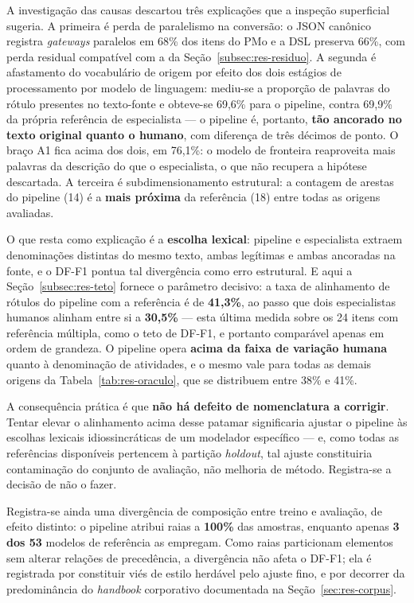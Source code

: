 A investigação das causas descartou três explicações que a inspeção superficial sugeria. A primeira é perda de paralelismo na conversão: o JSON canônico registra \textit{gateways} paralelos em 68\% dos itens do PMo e a DSL preserva 66\%, com perda residual compatível com a da Seção~\ref{subsec:res-residuo}. A segunda é afastamento do vocabulário de origem por efeito dos dois estágios de processamento por modelo de linguagem: mediu-se a proporção de palavras do rótulo presentes no texto-fonte e obteve-se 69,6\% para o pipeline, contra 69,9\% da própria referência de especialista --- o pipeline é, portanto, \textbf{tão ancorado no texto original quanto o humano}, com diferença de três décimos de ponto. O braço A1 fica acima dos dois, em 76,1\%: o modelo de fronteira reaproveita mais palavras da descrição do que o especialista, o que não recupera a hipótese descartada. A terceira é subdimensionamento estrutural: a contagem de arestas do pipeline (14) é a \textbf{mais próxima} da referência (18) entre todas as origens avaliadas.

O que resta como explicação é a \textbf{escolha lexical}: pipeline e especialista extraem denominações distintas do mesmo texto, ambas legítimas e ambas ancoradas na fonte, e o DF-F1 pontua tal divergência como erro estrutural. E aqui a Seção~\ref{subsec:res-teto} fornece o parâmetro decisivo: a taxa de alinhamento de rótulos do pipeline com a referência é de \textbf{41,3\%}, ao passo que dois especialistas humanos alinham entre si a \textbf{30,5\%} --- esta última medida sobre os 24 itens com referência múltipla, como o teto de DF-F1, e portanto comparável apenas em ordem de grandeza. O pipeline opera \textbf{acima da faixa de variação humana} quanto à denominação de atividades, e o mesmo vale para todas as demais origens da Tabela~\ref{tab:res-oraculo}, que se distribuem entre 38\% e 41\%.

A consequência prática é que \textbf{não há defeito de nomenclatura a corrigir}. Tentar elevar o alinhamento acima desse patamar significaria ajustar o pipeline às escolhas lexicais idiossincráticas de um modelador específico --- e, como todas as referências disponíveis pertencem à partição \textit{holdout}, tal ajuste constituiria contaminação do conjunto de avaliação, não melhoria de método. Registra-se a decisão de não o fazer.

Registra-se ainda uma divergência de composição entre treino e avaliação, de efeito distinto: o pipeline atribui raias a \textbf{100\%} das amostras, enquanto apenas \textbf{3 dos 53} modelos de referência as empregam. Como raias particionam elementos sem alterar relações de precedência, a divergência não afeta o DF-F1; ela é registrada por constituir viés de estilo herdável pelo ajuste fino, e por decorrer da predominância do \textit{handbook} corporativo documentada na Seção~\ref{sec:res-corpus}.

